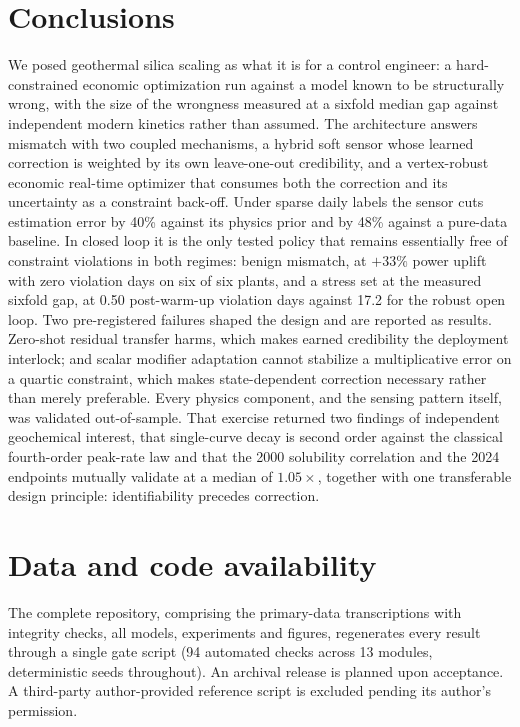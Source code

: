 \section{Conclusions}\label{sec:conclusions}

We posed geothermal silica scaling as what it is for a control
engineer: a hard-constrained economic optimization run against a model
known to be structurally wrong, with the size of the wrongness measured
at a sixfold median gap against independent modern kinetics rather than
assumed. The architecture answers mismatch with two coupled mechanisms,
a hybrid soft sensor whose learned correction is weighted by its own
leave-one-out credibility, and a vertex-robust economic real-time
optimizer that consumes both the correction and its uncertainty as a
constraint back-off. Under sparse daily labels the sensor cuts
estimation error by 40\% against its physics prior and by 48\% against
a pure-data baseline. In closed loop it is the only tested policy that
remains essentially free of constraint violations in both regimes:
benign mismatch, at $+33\%$ power uplift with zero violation days on
six of six plants, and a stress set at the measured sixfold gap, at
0.50 post-warm-up violation days against 17.2 for the robust open
loop. Two pre-registered failures shaped the design and are reported
as results. Zero-shot residual transfer harms, which makes earned
credibility the deployment interlock; and scalar modifier adaptation
cannot stabilize a multiplicative error on a quartic constraint, which
makes state-dependent correction necessary rather than merely
preferable. Every physics component, and the sensing pattern itself,
was validated out-of-sample. That exercise returned two findings of
independent geochemical interest, that single-curve decay is second
order against the classical fourth-order peak-rate law and that the
2000 solubility correlation and the 2024 endpoints mutually validate
at a median of $1.05\times$, together with one transferable design
principle: identifiability precedes correction.

\section*{Data and code availability}
The complete repository, comprising the primary-data transcriptions
with integrity checks, all models, experiments and figures, regenerates
every result through a single gate script (94 automated checks across
13 modules, deterministic seeds throughout). An archival release is
planned upon acceptance. A third-party author-provided reference script
is excluded pending its author's permission.

